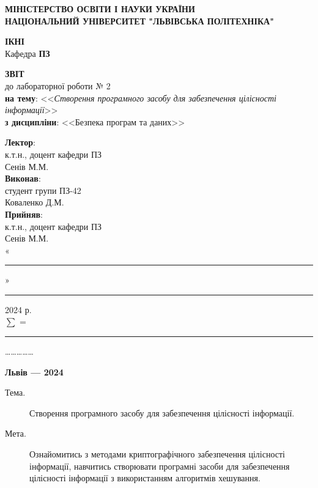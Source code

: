 \documentclass[oneside,14pt]{extarticle}
\newcommand\subject{Безпека програм та даних}
\newcommand\lecturer{к.т.н., доцент кафедри ПЗ\\Сенів М.М.}
\newcommand\teacher{к.т.н., доцент кафедри ПЗ\\Сенів М.М.}
\newcommand\mygroup{ПЗ-42}
\newcommand\lab{2}
\newcommand\theme{Створення програмного засобу для забезпечення цілісності інформації}
\newcommand\purpose{Ознайомитись з методами криптографічного забезпечення
	цілісності інформації, навчитись створювати програмні засоби для
	забезпечення цілісності інформації з використанням алгоритмів хешування}
\begin{document}
\begin{normalsize}
	\begin{titlepage}
		\thispagestyle{empty}
		\begin{center}
			\textbf{МІНІСТЕРСТВО ОСВІТИ І НАУКИ УКРАЇНИ\\
				НАЦІОНАЛЬНИЙ УНІВЕРСИТЕТ "ЛЬВІВСЬКА ПОЛІТЕХНІКА"}
		\end{center}
		\begin{flushright}
			\textbf{ІКНІ}\\
			Кафедра \textbf{ПЗ}
		\end{flushright}
		\vspace{80pt}
		\begin{center}
			\textbf{ЗВІТ}\\
			\vspace{10pt}
			до лабораторної роботи № \lab\\
			\textbf{на тему}: <<\textit{\theme}>>\\
			\textbf{з дисципліни}: <<\subject>>
		\end{center}
		\vspace{80pt}
		\begin{flushright}
			
			\textbf{Лектор}:\\
			\lecturer\\
			\vspace{28pt}
			\textbf{Виконав}:\\
			
			студент групи \mygroup\\
			Коваленко Д.М.\\
			\vspace{28pt}
			\textbf{Прийняв}:\\
			
			\teacher\\
			
			\vspace{28pt}
			«\rule{1cm}{0.15mm}» \rule{1.5cm}{0.15mm} 2024 р.\\
			$\sum$ = \rule{1cm}{0.15mm}……………\\
			
		\end{flushright}
		\vspace{\fill}
		\begin{center}
			\textbf{Львів — 2024}
		\end{center}
	\end{titlepage}
		
	\begin{description}
		\item[Тема.] \theme.
		\item[Мета.] \purpose.
	\end{description}


\end{normalsize}
\end{document}
